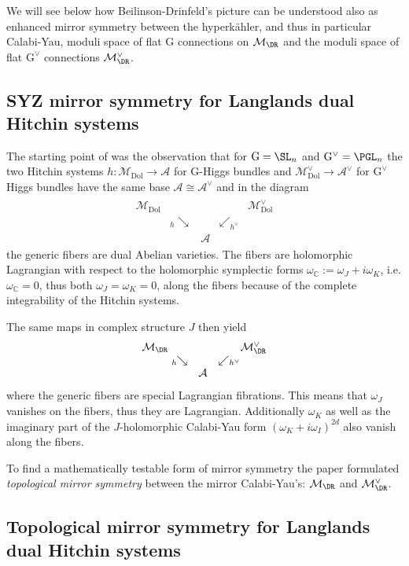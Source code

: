 \documentclass[12pt]{article}
\numberwithin{equation}{section}
\theoremstyle{remark}
\numberwithin{theorem}{section}
\def\beq{\begin{eqnarray}}
\def\eeq{\end{eqnarray}}
\def\A{{\mathcal A}}
\def\C{\mathbb{C}}
\def\M{{\mathcal{M}}}
\def\calA{{\mathcal{A}}}
\newcommand{\G}{\mathrm{G}}
\newcommand{\Dol}{{\mathrm{Dol}}}
\numberwithin{equation}{section}
\begin{document}
We will see below how Beilinson-Drinfeld's  picture can be understood also as enhanced mirror symmetry between the hyperk\"ahler, and thus in particular Calabi-Yau, moduli space of flat $\G$ connections on $\M_\DR$ and the moduli space of flat $\G^\vee$ connections $\M^\vee_{\DR}$. 

\subsection{SYZ mirror symmetry for Langlands dual Hitchin systems} 
The starting point of \cite{hausel-thaddeus} was the observation that for $\G=\SL_n$ and $\G^\vee=\PGL_n$ the two Hitchin systems $h:\M_\Dol\to \A$ for $\G$-Higgs bundles and $\M^\vee_\Dol\to \calA^\vee$ for $\G^\vee$ Higgs bundles have the same base $\calA\cong \calA^\vee$ and in the diagram  \beq \label{syzdol}\begin{array}{rcccl} \M_\Dol &&&&\!\!\!\!\!\!\M^\vee_\Dol \\ &\!\!\!\! {}_h \!\!\searrow&&\swarrow_{h^\vee} &  \\ &&\calA&& \end{array}\eeq the generic fibers are 
dual Abelian varieties. The fibers are holomorphic Lagrangian with respect to the holomorphic symplectic forms $\omega_\C:=\omega_J+i\omega_K$, i.e. $\omega_\C=0$, thus both $\omega_J=\omega_K=0$, along the fibers because of the complete integrability of the Hitchin systems. 

The same maps in complex structure $J$    then yield \beq \label{syzdr}\begin{array}{rcccl} \M_\DR &&&&\!\!\!\!\!\!\M^\vee_\DR \\ &\!\!\!\! {}_h \!\!\searrow&&\swarrow_{h^\vee} &  \\ &&\calA&& \end{array}\eeq where the generic fibers are special Lagrangian fibrations. This means that $\omega_J$  vanishes on the fibers, thus they are  Lagrangian.  Additionally $\omega_K$ as well as the imaginary part of the $J$-holomorphic Calabi-Yau form $(\omega_K+i \omega_I)^{2d}$ also vanish along the fibers. 

To find a mathematically testable form of mirror symmetry the paper \cite{hausel-thaddeus} formulated {\em topological mirror symmetry} between the mirror Calabi-Yau's: $\M_{\DR}$ and $\M^\vee_{\DR}$.
\subsection{Topological mirror symmetry for Langlands dual Hitchin systems}
\end{document}
